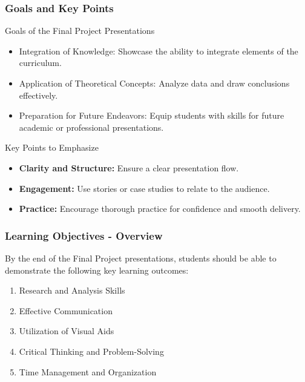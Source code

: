 \documentclass[aspectratio=169]{beamer}
\begin{document}
\begin{frame}[fragile]
    \frametitle{Goals and Key Points}
    \begin{block}{Goals of the Final Project Presentations}
        \begin{itemize}
            \item Integration of Knowledge: Showcase the ability to integrate elements of the curriculum.
            \item Application of Theoretical Concepts: Analyze data and draw conclusions effectively.
            \item Preparation for Future Endeavors: Equip students with skills for future academic or professional presentations.
        \end{itemize}
    \end{block}

    \begin{block}{Key Points to Emphasize}
        \begin{itemize}
            \item \textbf{Clarity and Structure:} Ensure a clear presentation flow.
            \item \textbf{Engagement:} Use stories or case studies to relate to the audience.
            \item \textbf{Practice:} Encourage thorough practice for confidence and smooth delivery.
        \end{itemize}
    \end{block}
\end{frame}

\begin{frame}[fragile]
    \frametitle{Learning Objectives - Overview}
    By the end of the Final Project presentations, students should be able to demonstrate the following key learning outcomes:
    \begin{enumerate}
        \item Research and Analysis Skills
        \item Effective Communication
        \item Utilization of Visual Aids
        \item Critical Thinking and Problem-Solving
        \item Time Management and Organization
    \end{enumerate}
\end{frame}
\end{document}
